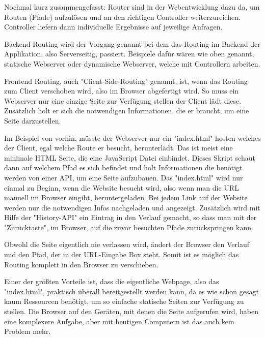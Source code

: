 Nochmal kurz zusammengefasst: Router sind in der Webentwicklung dazu da, um Routen (Pfade) aufzulösen und an den richtigen Controller weiterzureichen. Controller liefern dann individuelle Ergebnisse auf jeweilige Anfragen.


Backend Routing wird der Vorgang genannt bei dem das Routing im Backend der Applikation, also Serverseitig, passiert. Beispiele dafür wären wie oben genannt, statische Webserver oder dynamische Webserver, welche mit Controllern arbeiten.


Frontend Routing, auch "Client-Side-Routing" genannt, ist, wenn das Routing zum Client verschoben wird, also im Browser abgefertigt wird. So muss ein Webserver nur eine einzige Seite zur Verfügung stellen der Client lädt diese. Zusätzlich holt er sich die notwendigen Informationen, die er braucht, um eine Seite darzustellen.

Im Beispiel von vorhin, müsste der Webserver nur ein "{\ttfamily index.html}" hosten welches der Client, egal welche Route er besucht, herunterlädt. Das ist meist eine minimale HTML Seite, die eine JavaScript Datei einbindet. Dieses Skript schaut dann auf welchem Pfad es sich befindet und holt Informationen die benötigt werden von einer API, um eine Seite aufzubauen. Das "{\ttfamily index.html}" wird nur einmal zu Beginn, wenn die Website besucht wird, also wenn man die URL manuell im Browser eingibt, heruntergeladen. Bei jedem Link auf der Website werden nur die notwendigen Infos nachgeladen und angezeigt. Zusätzlich wird mit Hilfe der "History-API" ein Eintrag in den Verlauf gemacht, so dass man mit der "Zurücktaste", im Browser, auf die zuvor besuchten Pfade zurückspringen kann.

Obwohl die Seite eigentlich nie verlassen wird, ändert der Browser den Verlauf und den Pfad, der in der URL-Eingabe Box steht. Somit ist es möglich das Routing komplett in den Browser zu verschieben.


Einer der größten Vorteile ist, dass die eigentliche Webpage, also das "{\ttfamily index.html}", praktisch überall bereitgestellt werden kann, da es wie schon gesagt kaum Ressourcen benötigt, um so einfache statische Seiten zur Verfügung zu stellen. Die Browser auf den Geräten, mit denen die Seite aufgerufen wird, haben eine komplexere Aufgabe, aber mit heutigen Computern ist das auch kein Problem mehr.

